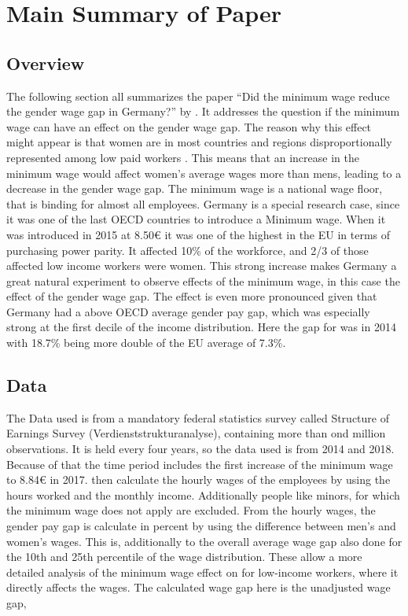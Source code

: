 \documentclass[12pt,draft,a4paper]{article}
\begin{document}
\section{Main Summary of Paper}
\subsection{Overview} \label{overview}

The following section all summarizes the paper “Did the minimum wage reduce the gender wage gap in Germany?” by \citet{CALIENDO22}. It addresses the question if the minimum wage can have an effect on the gender wage gap. 
The reason why this effect might appear is that women are in most countries and regions disproportionally represented among low paid workers \citep{kahn2015wage}.
This means that an increase in the minimum wage would affect women's average wages more than mens, leading to a decrease in the gender wage gap.
The minimum wage is a national wage floor, that is binding for almost all employees. Germany is a special research case, since it was one of the last OECD countries to introduce a Minimum wage.
When it was introduced in 2015 at 8.50€ it was one of the highest in the EU in terms of purchasing power parity. It affected 10\% of the workforce, and 2/3 of those affected low income workers were women.  
This strong increase makes Germany a great natural experiment to observe effects of the minimum wage, in this case the effect of the gender wage gap. The effect is even more pronounced given that Germany had a above OECD average gender pay gap, which was especially strong at the first decile of the income distribution.  Here the gap for was in 2014 with 18.7\% being more double of the EU average of 7.3\%. \citep{oecd}

\subsection{Data}
The Data used is from a mandatory federal statistics survey called Structure of Earnings Survey (Verdienststrukturanalyse), containing more than ond million observations.
It is held every four years, so the data used is from 2014 and 2018. Because of that the time period includes the first increase of the minimum wage to 8.84€ in 2017.  then calculate the hourly wages of the employees by using the hours worked and the monthly income. Additionally people like minors, for which the minimum wage does not apply are excluded. 
From the hourly wages, the gender pay gap is calculate in percent by using the difference between men's and women's wages. This is, additionally to the overall average wage gap also done for the 10th and 25th percentile of the wage distribution. These allow a more detailed analysis of the minimum wage effect on for low-income workers, where it directly affects the wages. The calculated wage gap here is the unadjusted wage gap, 
\end{document}

